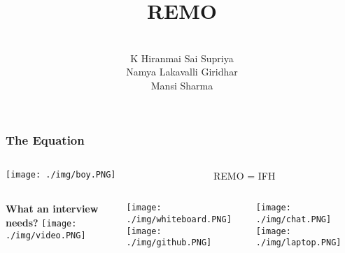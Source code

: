 \documentclass[14pt]{beamer}
\title[REMO]{\huge REMO}
\author[Team 23]{ \\
K Hiranmai Sai Supriya\\
Namya Lakavalli Giridhar\\
Mansi Sharma \\
}
\begin{document}
{
\begin{frame}
    \titlepage
\end{frame}
}

{
\begin{frame}
    \frametitle {\textcolor{whitegray}{The Equation}}
    \begin{columns}
        \begin{column}{0.4\textwidth}
    \texttt{[image: ./img/boy.PNG]}
\end{column}
\begin{column}{0.7\textwidth}
    \textcolor{whitegray}{\Huge REMO = IFH }
\end{column}
\end{columns}
\end{frame}
}

{
\begin{frame}
    \begin{columns}
        \begin{column}{0.3\textwidth}  
            \newline 
            \textcolor{deepblue}{\Large \textbf{What an interview needs?}} \pause
            \newline
            \newline
            \newline
            \newline
            \texttt{[image: ./img/video.PNG]} \pause
        \end{column}
        \begin{column}{0.3\textwidth}   
            \texttt{[image: ./img/whiteboard.PNG]} \pause
            \newline
            \newline
            \newline
            \texttt{[image: ./img/github.PNG]} \pause
        \end{column}
        \begin{column}{0.3\textwidth}
            \texttt{[image: ./img/chat.PNG]} \pause
            \newline
            \newline
            \newline
            \texttt{[image: ./img/laptop.PNG]}     
        \end{column}
\end{columns}
\end{frame}
}
\end{document}
